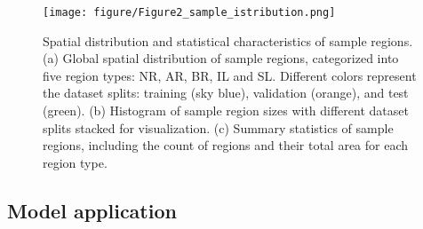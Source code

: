 \documentclass[preprint,12pt,authoryear]{elsarticle}
\begin{document}
\begin{figure}[h]
    \centering
    \texttt{[image: figure/Figure2\_sample\_istribution.png]}
    \caption{Spatial distribution and statistical characteristics of sample regions. (a) Global spatial distribution of sample regions, categorized into five region types: NR, AR, BR, IL and SL. Different colors represent the dataset splits: training (sky blue), validation (orange), and test (green). (b) Histogram of sample region sizes with different dataset splits stacked for visualization. (c) Summary statistics of sample regions, including the count of regions and their total area for each region type.}
    \label{fig:Fig2}
\end{figure}

\subsection{Model application}
\label{subsec3}
\end{document}
